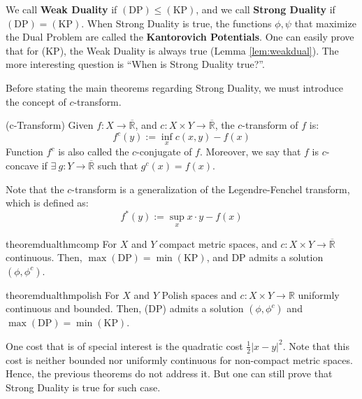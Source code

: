 We call \textbf{Weak Duality} if
$\mathrm{(DP)} \leq \mathrm{(KP)}$, and we call \textbf{Strong Duality}
if $\mathrm{(DP)} = \mathrm{(KP)}$.
When Strong Duality is true, the functions $\phi, \psi$ that maximize the Dual Problem
are called the \textbf{Kantorovich Potentials}.
One can easily prove that for (KP), the Weak Duality is always true (Lemma \ref{lem:weakdual}).
The more interesting question is ``When is Strong Duality true?''.

Before stating the main theorems regarding Strong Duality, we must introduce the concept
of $c$-transform.

\begin{definition}(c-Transform)
  Given $f: X \to \overline{\mathbb R}$, and
  $c:X\times Y \to \overline{\mathbb R}$,
  the $c$-transform of $f$ is:
  \begin{equation}
    f^c(y) := \inf_x c(x,y) - f(x)
  \end{equation}
  Function $f^c$ is also called the $c$-conjugate of $f$. Moreover,
  we say that $f$ is $c$-concave if
  $\exists \ g:Y\to \overline{\mathbb R}$
  such that $g^c(x) = f(x)$.
  \label{def:c-transform}

  Note that the $c$-transform is a generalization of the
  Legendre-Fenchel transform, which is defined as:
  \begin{equation}
    f^*(y) := \sup_x x \cdot y - f(x)
  \end{equation}
\end{definition}

\begin{restatable}{theorem}{dualthmcomp}
  For $X$ and $Y$ compact metric spaces, and $c:X \times Y \to
    \overline{\mathbb R}$ continuous. Then, $\max\mathrm{(DP)} = \mathrm{\min(KP)}$,
    and DP admits a solution $(\phi,\phi^c)$.
  \label{thm:compactstrongduality}
\end{restatable}

\begin{restatable}{theorem}{dualthmpolish}
  For $X$ and $Y$ Polish spaces and $c:X\times Y \to \mathbb R$ uniformly continuous and bounded. Then,
  (DP) admits a solution $(\phi,\phi^c)$ and $\mathrm{\max(DP)}=\mathrm{\min (KP)}$.
  \label{thm:polishStrongDuality}
\end{restatable}

One cost that is of special interest is the quadratic cost $\frac{1}{2} |x-y|^2$. Note that
this cost is neither bounded nor uniformly continuous for non-compact metric spaces. Hence, the previous
theorems do not address it. But one can still prove that Strong Duality is true for such case.

